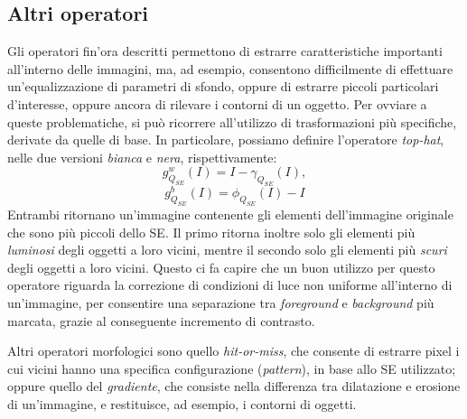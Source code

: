 \subsection{Altri operatori}
\label{subsec:math-morph-others}
Gli operatori fin'ora descritti permettono di estrarre caratteristiche importanti all'interno delle immagini, ma, ad esempio, consentono difficilmente di effettuare un'equalizzazione di parametri di sfondo, oppure di estrarre piccoli particolari d'interesse, oppure ancora di rilevare i contorni di un oggetto. Per ovviare a queste problematiche, si pu\`o ricorrere all'utilizzo di trasformazioni pi\`u specifiche, derivate da quelle di base. In particolare, possiamo definire l'operatore \textit{top-hat}, nelle due versioni \textit{bianca} e \textit{nera}, rispettivamente:
\begin{equation}
	\label{eq:white-top-hat}
	g_{Q_{SE}}^{w}(I) = I - \gamma_{Q_{SE}}(I),
\end{equation}
\begin{equation}
	\label{eq:black-top-hat}
	g_{Q_{SE}}^{b}(I) = \phi_{Q_{SE}}(I) - I
\end{equation}
Entrambi ritornano un'immagine contenente gli elementi dell'immagine originale che sono pi\`u piccoli dello SE. Il primo ritorna inoltre solo gli elementi pi\`u \textit{luminosi} degli oggetti a loro vicini, mentre il secondo solo gli elementi pi\`u \textit{scuri} degli oggetti a loro vicini. Questo ci fa capire che un buon utilizzo per questo operatore riguarda la correzione di condizioni di luce non uniforme all'interno di un'immagine, per consentire una separazione tra \textit{foreground} e \textit{background} pi\`u marcata, grazie al conseguente incremento di contrasto.
\par Altri operatori morfologici sono quello \textit{hit-or-miss}, che consente di estrarre pixel i cui vicini hanno una specifica configurazione (\textit{pattern}), in base allo SE utilizzato; oppure quello del \textit{gradiente}, che consiste nella differenza tra dilatazione e erosione di un'immagine, e restituisce, ad esempio, i contorni di oggetti.
